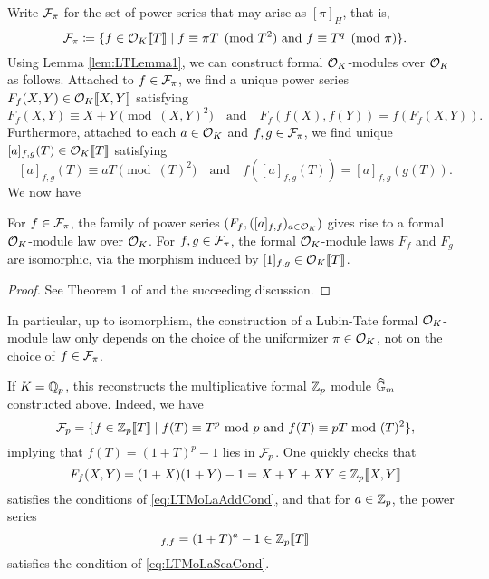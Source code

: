\documentclass[../main.tex]{subfiles}
\begin{document}
Write $\mathcal{F}_\pi$ for the set of power series that may arise as $[\pi]_H$, that is,
\begin{equation*}
  \mathcal{F}_\pi \coloneqq \{f \in \mathcal{O}_K \llbracket T \rrbracket \mid f \equiv \pi T \pmod {T^2}
    \text{ and } f \equiv T^q \pmod \pi\}. 
\end{equation*}
Using Lemma \ref{lem:LTLemma1}, we can construct formal $\mathcal{O}_K$-modules over 
$\mathcal{O}_K$ as follows. Attached to $f \in \mathcal{F}_\pi$, we find a unique power series
$F_f(X,Y) \in \mathcal{O}_K\llbracket X,Y\rrbracket$ satisfying
\begin{equation}\label{eq:LTMoLaAddCond}
  F_f(X,Y) \equiv X+Y \pmod{(X,Y)^2} \quad \text{and} \quad
  F_f(f(X),f(Y)) = f(F_f(X,Y)).
\end{equation}
Furthermore, attached to each $a \in \mathcal{O}_K$ and $f,g \in \mathcal{F}_\pi$, we find
unique $[a]_{f,g}(T) \in \mathcal{O}_K\llbracket T \rrbracket$ satisfying
\begin{equation}\label{eq:LTMoLaScaCond}
  [a]_{f,g}(T) \equiv aT \pmod {(T)^2} \quad \text{and} \quad
  f([a]_{f,g}(T)) = [a]_{f,g}(g(T)).
\end{equation}
We now have
\begin{thm}
  For $f \in \mathcal{F}_\pi$, the family of power series $(F_f, ([a]_{f,f})_{a \in \mathcal{O}_K})$
  gives rise to a formal $\mathcal{O}_K$-module law over $\mathcal{O}_K$. For 
  $f,g \in \mathcal{F}_\pi$, the formal $\mathcal{O}_K$-module laws $F_f$ and $F_g$ are isomorphic,
  via the morphism induced by $[1]_{f,g} \in \mathcal{O}_K\llbracket T \rrbracket$. 

\begin{proof}
  See Theorem 1 of \cite{LubinTateFormalMult} and the succeeding discussion.
\end{proof}
\end{thm}
In particular, up to isomorphism, the construction of a Lubin-Tate formal
$\mathcal{O}_K$-module law only depends on the choice of the uniformizer $\pi \in
\mathcal{O}_K$, not on the choice of $f \in \mathcal{F}_\pi$. 

\begin{xpl}
  If $K = \mathbb{Q}_p$, this reconstructs the multiplicative formal 
  $\mathbb{Z}_p$ module $\widehat{\mathbb{G}}_m$ constructed above. Indeed, we have 
  \begin{equation*}
    \mathcal{F}_p = \{f \in \mathbb{Z}_p\llbracket T \rrbracket \mid f(T) \equiv T^p \text{ mod } p
    \text{ and } f(T) \equiv pT \text{ mod } (T)^2 \},
  \end{equation*}
  implying that $f(T) = (1+T)^p-1$ lies in $\mathcal{F}_p$.  
  One quickly checks that 
  \begin{equation*}
    F_f(X,Y) = (1+X)(1+Y) - 1 = X + Y + XY \in \mathbb{Z}_p \llbracket X,Y \rrbracket
  \end{equation*}
  satisfies the conditions of \eqref{eq:LTMoLaAddCond}, and that 
  for $a \in \mathbb{Z}_p$, the power series
  \begin{equation*}
    [a]_{f,f} = (1+T)^{a} - 1 \in \Z_p \llbr T \rrbr
  \end{equation*}
  satisfies the condition of \eqref{eq:LTMoLaScaCond}. 
\end{xpl}
\end{document}
